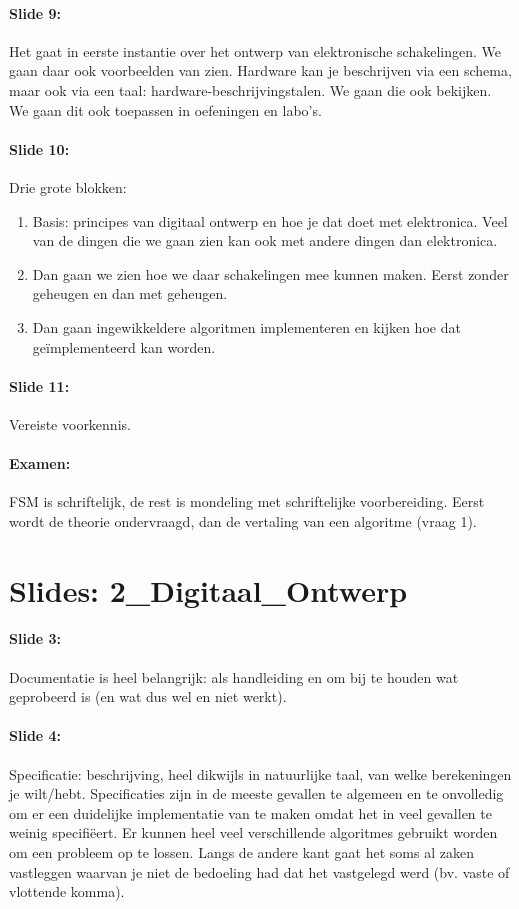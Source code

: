 \documentclass[10pt,a4paper]{book}
\begin{document}
\paragraph{Slide 9:} Het gaat in eerste instantie over het ontwerp van elektronische schakelingen. We gaan daar ook voorbeelden van zien. Hardware kan je beschrijven via een schema, maar ook via een taal: hardware-beschrijvingstalen. We gaan die ook bekijken. We gaan dit ook toepassen in oefeningen en labo's.

\paragraph{Slide 10:} Drie grote blokken:
\begin{enumerate}
\item Basis: principes van digitaal ontwerp en hoe je dat doet met elektronica. Veel van de dingen die we gaan zien kan ook met andere dingen dan elektronica. 
\item Dan gaan we zien hoe we daar schakelingen mee kunnen maken. Eerst zonder geheugen en dan met geheugen. 
\item Dan gaan ingewikkeldere algoritmen implementeren en kijken hoe dat ge\"implementeerd kan worden.
\end{enumerate}

\paragraph{Slide 11:} Vereiste voorkennis.

\paragraph{Examen:} FSM is schriftelijk, de rest is mondeling met schriftelijke voorbereiding. Eerst wordt de theorie ondervraagd, dan de vertaling van een algoritme (vraag 1).

\section{Slides: 2\_Digitaal\_Ontwerp}

\paragraph{Slide 3:} Documentatie is heel belangrijk: als handleiding en om bij te houden wat geprobeerd is (en wat dus wel en niet werkt).

\paragraph{Slide 4:} Specificatie: beschrijving, heel dikwijls in natuurlijke taal, van welke berekeningen je wilt/hebt. Specificaties zijn in de meeste gevallen te algemeen en te onvolledig om er een duidelijke implementatie van te maken omdat het in veel gevallen te weinig specifi\"eert. Er kunnen heel veel verschillende algoritmes gebruikt worden om een probleem op te lossen. Langs de andere kant gaat het soms al zaken vastleggen waarvan je niet de bedoeling had dat het vastgelegd werd (bv. vaste of vlottende komma). 
\end{document}
